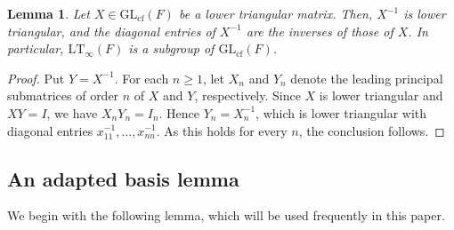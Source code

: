 \documentclass[11pt,reqno,a4paper]{amsart}
\numberwithin{equation}{section}
\newtheorem{lemma}[theorem]{Lemma}
\theoremstyle{definition}
\theoremstyle{plain}
\newcommand{\cf}{\mathrm{cf}}
\newcommand{\GL}{\mathrm{GL}}
\newcommand{\LT}{\mathrm{LT}_{\infty}}
\begin{document}
\begin{lemma}
Let $X\in\GL_{\cf}(F)$ be a lower triangular matrix. Then, $X^{-1}$ is lower triangular, and the diagonal entries of $X^{-1}$ are the inverses of those of $X$. In particular, $\LT(F)$ is a subgroup of $\GL_{\cf}(F)$.
\end{lemma}
\begin{proof}
Put $Y=X^{-1}$. For each $n\ge1$, let $X_n$ and $Y_n$ denote the leading principal submatrices of order $n$ of $X$ and $Y$, respectively. Since $X$ is lower triangular and $XY=I$, we have $X_nY_n=I_n$. Hence $Y_n=X_n^{-1}$, which is lower triangular with diagonal entries $x_{11}^{-1},\ldots,x_{nn}^{-1}$. As this holds for every $n$, the conclusion follows.
\end{proof}

\subsection{An adapted basis lemma}
We begin with the following lemma, which will be used frequently in this paper.
\end{document}
